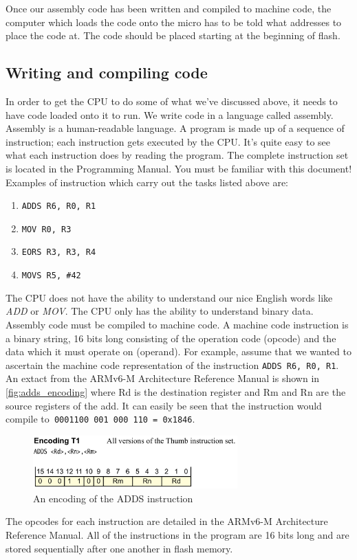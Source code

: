 Once our assembly code has been written and compiled to machine code, the computer which loads the code onto the micro has to be told what addresses to place the code at. The code should be placed starting at the beginning of flash. 

\subsection{Writing and compiling code}
In order to get the CPU to do some of what we've discussed above, it needs to have code loaded onto it to run. We write code in a language called assembly. Assembly is a human-readable language. A program is made up of a sequence of instruction; each instruction gets executed by the CPU. It's quite easy to see what each instruction does by reading the program.  The complete instruction set is located in the Programming Manual. You must be familiar with this document! Examples of instruction which carry out the tasks listed above are:
\begin{enumerate}
  \item \texttt{ADDS R6, R0, R1}
  \item \texttt{MOV R0, R3}
  \item \texttt{EORS R3, R3, R4}
  \item \texttt{MOVS R5, \#42}
\end{enumerate}
The CPU does not have the ability to understand our nice English words like \textit{ADD} or \textit{MOV}. The CPU only has the ability to understand binary data. Assembly code must be compiled to machine code. A machine code instruction is a binary string, 16 bits long consisting of the operation code (opcode) and the data which it must operate on (operand).
For example, assume that we wanted to ascertain the machine code representation of the instruction \texttt{ADDS R6, R0, R1}. An extact from the ARMv6-M Architecture Reference Manual is shown in \autoref{fig:adds_encoding} where Rd is the destination register and Rm and Rn are the source registers of the add. It can easily be seen that the instruction would compile to\texttt{ 0001100 001 000 110 = 0x1846}.
\begin{figure}
\centering
\includegraphics[width=0.7\textwidth]{./week1/adds_encoding}
\caption{An encoding of the ADDS instruction}
\label{fig:adds_encoding}
\end{figure}
The opcodes for each instruction are detailed in the ARMv6-M Architecture Reference Manual.
All of the instructions in the program are 16 bits long and are stored sequentially after one another in flash memory. 

